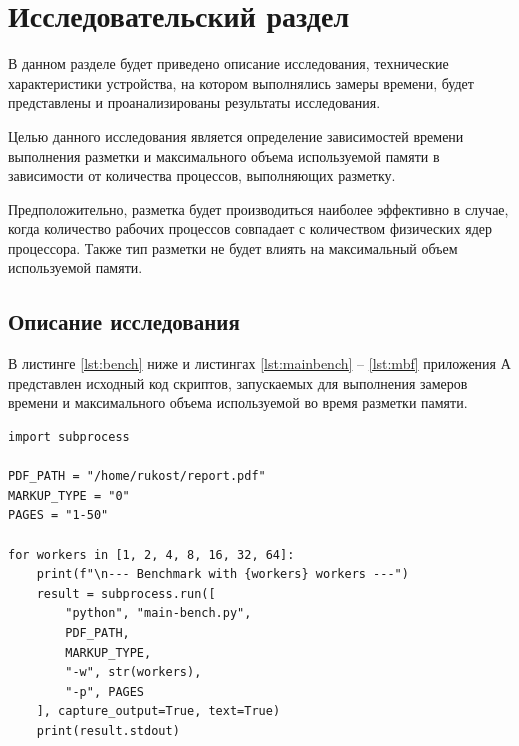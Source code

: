 \section{Исследовательский раздел}


В данном разделе будет приведено описание исследования, технические характеристики устройства, на котором выполнялись замеры времени, будет представлены и проанализированы результаты исследования.

Целью данного исследования является определение зависимостей времени выполнения разметки и максимального объема используемой памяти в зависимости от количества процессов, выполняющих разметку.

Предположительно, разметка будет производиться наиболее эффективно в случае, когда количество рабочих процессов совпадает с количеством физических ядер процессора.
Также тип разметки не будет влиять на максимальный объем используемой памяти.


\subsection{Описание исследования}

В листинге \ref{lst:bench} ниже и листингах \ref{lst:mainbench} -- \ref{lst:mbf} приложения А представлен исходный код скриптов, запускаемых для выполнения замеров времени и максимального объема используемой во время разметки памяти.

\begin{lstlisting}[caption={bench.py --- Скрипт для запуска теста производительности}, label={lst:bench}]
import subprocess

PDF_PATH = "/home/rukost/report.pdf"
MARKUP_TYPE = "0"
PAGES = "1-50"

for workers in [1, 2, 4, 8, 16, 32, 64]:
    print(f"\n--- Benchmark with {workers} workers ---")
    result = subprocess.run([
        "python", "main-bench.py",
        PDF_PATH,
        MARKUP_TYPE,
        "-w", str(workers),
        "-p", PAGES
    ], capture_output=True, text=True)
    print(result.stdout)
\end{lstlisting}

